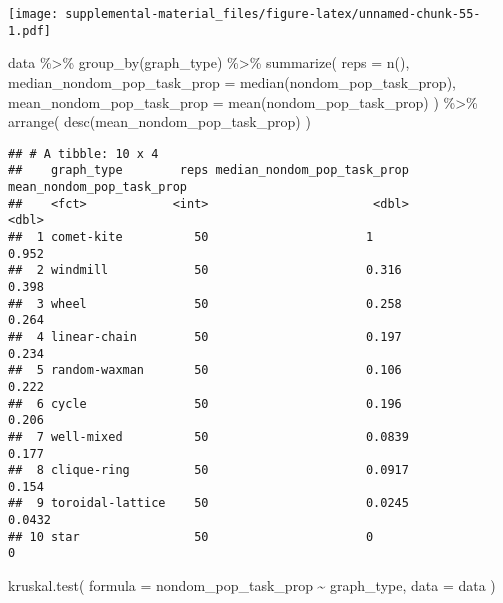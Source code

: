 \documentclass[
]{book}
\newenvironment{Shaded}{\begin{snugshade}}{\end{snugshade}}
\newcommand{\AttributeTok}[1]{\textcolor[rgb]{0.77,0.63,0.00}{#1}}
\newcommand{\FunctionTok}[1]{\textcolor[rgb]{0.00,0.00,0.00}{#1}}
\newcommand{\NormalTok}[1]{#1}
\newcommand{\SpecialCharTok}[1]{\textcolor[rgb]{0.00,0.00,0.00}{#1}}
\begin{document}
\texttt{[image: supplemental-material\_files/figure-latex/unnamed-chunk-55-1.pdf]}

\begin{Shaded}
\begin{Highlighting}[]
\NormalTok{data }\SpecialCharTok{\%\textgreater{}\%}
  \FunctionTok{group\_by}\NormalTok{(graph\_type) }\SpecialCharTok{\%\textgreater{}\%}
  \FunctionTok{summarize}\NormalTok{(}
    \AttributeTok{reps =} \FunctionTok{n}\NormalTok{(),}
    \AttributeTok{median\_nondom\_pop\_task\_prop =} \FunctionTok{median}\NormalTok{(nondom\_pop\_task\_prop),}
    \AttributeTok{mean\_nondom\_pop\_task\_prop =} \FunctionTok{mean}\NormalTok{(nondom\_pop\_task\_prop)}
\NormalTok{  ) }\SpecialCharTok{\%\textgreater{}\%}
  \FunctionTok{arrange}\NormalTok{(}
    \FunctionTok{desc}\NormalTok{(mean\_nondom\_pop\_task\_prop)}
\NormalTok{  )}
\end{Highlighting}
\end{Shaded}

\begin{verbatim}
## # A tibble: 10 x 4
##    graph_type        reps median_nondom_pop_task_prop mean_nondom_pop_task_prop
##    <fct>            <int>                       <dbl>                     <dbl>
##  1 comet-kite          50                      1                         0.952 
##  2 windmill            50                      0.316                     0.398 
##  3 wheel               50                      0.258                     0.264 
##  4 linear-chain        50                      0.197                     0.234 
##  5 random-waxman       50                      0.106                     0.222 
##  6 cycle               50                      0.196                     0.206 
##  7 well-mixed          50                      0.0839                    0.177 
##  8 clique-ring         50                      0.0917                    0.154 
##  9 toroidal-lattice    50                      0.0245                    0.0432
## 10 star                50                      0                         0
\end{verbatim}

\begin{Shaded}
\begin{Highlighting}[]
\FunctionTok{kruskal.test}\NormalTok{(}
  \AttributeTok{formula =}\NormalTok{ nondom\_pop\_task\_prop }\SpecialCharTok{\textasciitilde{}}\NormalTok{ graph\_type,}
  \AttributeTok{data =}\NormalTok{ data}
\NormalTok{)}
\end{Highlighting}
\end{Shaded}
\end{document}

